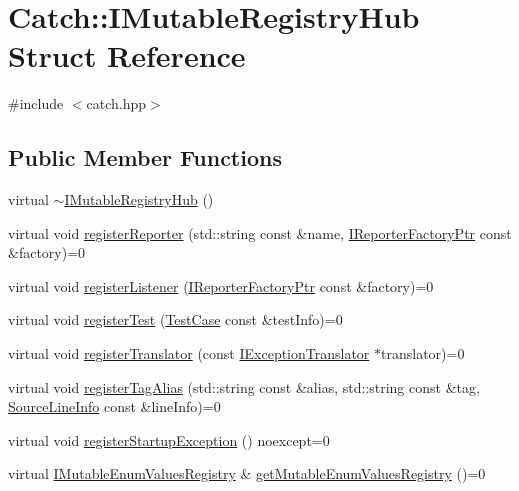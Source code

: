 \hypertarget{struct_catch_1_1_i_mutable_registry_hub}{}\section{Catch\+::I\+Mutable\+Registry\+Hub Struct Reference}
\label{struct_catch_1_1_i_mutable_registry_hub}


{\ttfamily \#include $<$catch.\+hpp$>$}

\subsection*{Public Member Functions}
\begin{DoxyCompactItemize}
\item 
virtual \mbox{\hyperlink{struct_catch_1_1_i_mutable_registry_hub_a759ca1e044e19f905fb4d306f1367193}{$\sim$\+I\+Mutable\+Registry\+Hub}} ()
\item 
virtual void \mbox{\hyperlink{struct_catch_1_1_i_mutable_registry_hub_a1c0ac202ac31ee9f88e8ff5cbac4b243}{register\+Reporter}} (std\+::string const \&name, \mbox{\hyperlink{namespace_catch_ad1b36ac40c2739e52fd453dcdddf0d09}{I\+Reporter\+Factory\+Ptr}} const \&factory)=0
\item 
virtual void \mbox{\hyperlink{struct_catch_1_1_i_mutable_registry_hub_abd892a133f85581fd00ee75bb379ca56}{register\+Listener}} (\mbox{\hyperlink{namespace_catch_ad1b36ac40c2739e52fd453dcdddf0d09}{I\+Reporter\+Factory\+Ptr}} const \&factory)=0
\item 
virtual void \mbox{\hyperlink{struct_catch_1_1_i_mutable_registry_hub_a11b85c6744d88c9f83fe16ad4a8dd451}{register\+Test}} (\mbox{\hyperlink{class_catch_1_1_test_case}{Test\+Case}} const \&test\+Info)=0
\item 
virtual void \mbox{\hyperlink{struct_catch_1_1_i_mutable_registry_hub_ae6825365102693cf7707db022a2c2b49}{register\+Translator}} (const \mbox{\hyperlink{struct_catch_1_1_i_exception_translator}{I\+Exception\+Translator}} $\ast$translator)=0
\item 
virtual void \mbox{\hyperlink{struct_catch_1_1_i_mutable_registry_hub_abf2e386b6f94f615719ada711adbf822}{register\+Tag\+Alias}} (std\+::string const \&alias, std\+::string const \&tag, \mbox{\hyperlink{struct_catch_1_1_source_line_info}{Source\+Line\+Info}} const \&line\+Info)=0
\item 
virtual void \mbox{\hyperlink{struct_catch_1_1_i_mutable_registry_hub_a72a7d5386851ac3200f8da794a009c86}{register\+Startup\+Exception}} () noexcept=0
\item 
virtual \mbox{\hyperlink{struct_catch_1_1_i_mutable_enum_values_registry}{I\+Mutable\+Enum\+Values\+Registry}} \& \mbox{\hyperlink{struct_catch_1_1_i_mutable_registry_hub_ab91c4fd63eeb0efd9bfb270e8bbd231d}{get\+Mutable\+Enum\+Values\+Registry}} ()=0
\end{DoxyCompactItemize}


